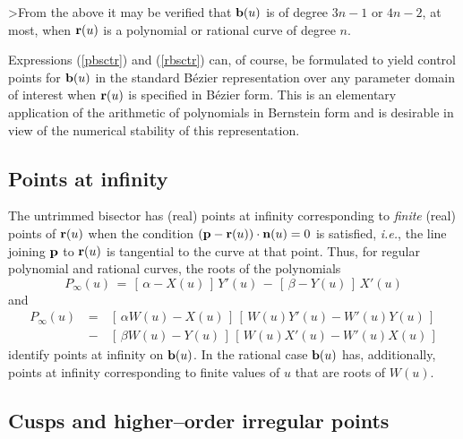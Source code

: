 \begin{rmk} {\rm
>From the above it may be verified that ${\bf b}(u)$ is of degree
$3n-1$ or $4n-2$, at most, when ${\bf r}(u)$ is a polynomial or
rational curve of degree $n$. }
\end{rmk}

Expressions (\ref{pbsctr}) and (\ref{rbsctr}) can, of course, be
formulated to yield control points for ${\bf b}(u)$ in the standard
B\'ezier representation over any parameter domain of interest when
${\bf r}(u)$ is specified in B\'ezier form. This is an elementary
application of the arithmetic of polynomials in Bernstein form \cite
{farouki88} and is desirable in view of the numerical stability
\cite{farouki87} of this representation.

\subsection{Points at infinity}

The untrimmed bisector has (real) points at infinity corresponding
to {\it finite\/} (real) points of ${\bf r}(u)$ when the condition
$({\bf p}-{\bf r}(u))\cdot{\bf n}(u)=0$ is satisfied, {\it i.e.},
the line joining ${\bf p}$ to ${\bf r}(u)$ is tangential to the
curve at that point. Thus, for regular polynomial and rational
curves, the roots of the polynomials
\begin{equation} \label{Pinf}
P_\infty(u) \,=\,
[\,\alpha-X(u)\,]\,Y'(u) \,-\, [\,\beta-Y(u)\,]\,X'(u)
\end{equation}
and
\begin{eqnarray} \label{Rinf}
P_\infty(u)
&\,=\,& [\,\alpha W(u)-X(u)\,]\,[\,W(u)Y'(u)-W'(u)Y(u)\,] \nonumber \\
&\,-\,& [\,\beta  W(u)-Y(u)\,]\,[\,W(u)X'(u)-W'(u)X(u)\,]
\end{eqnarray}
identify points at infinity on ${\bf b}(u)$. In the rational case
${\bf b}(u)$ has, additionally, points at infinity corresponding to
finite values of $u$ that are roots of $W(u)$.

\subsection{Cusps and higher--order irregular points}

